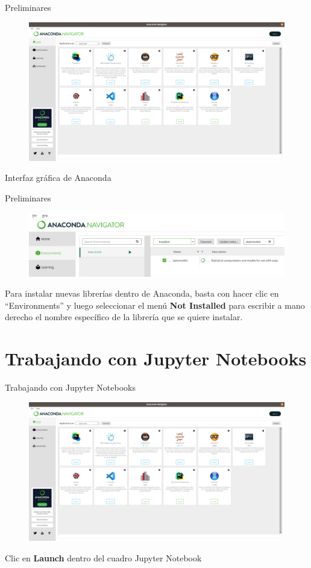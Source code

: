 \documentclass{beamer}
\begin{document}
\begin{frame}{Preliminares}
\begin{figure}
\includegraphics[width=.8\textwidth]{anaconda.png}
 \end{figure}
Interfaz gráfica de Anaconda
\end{frame}

\begin{frame}{Preliminares}
\begin{figure}
\includegraphics[width=.8\textwidth]{Install.png}
 \end{figure}
Para instalar nuevas librerías dentro de Anaconda, basta con hacer clic en ``Environments'' y luego seleccionar el menú \textbf{Not Installed} para escribir a mano derecho el nombre específico de la librería que se quiere instalar.
\end{frame}

\section{Trabajando con Jupyter Notebooks}
\begin{frame}{Trabajando con Jupyter Notebooks}
\begin{figure}
\includegraphics[width=.8\textwidth]{anaconda.png}
 \end{figure}
Clic en \textbf{Launch} dentro del cuadro Jupyter Notebook
\end{frame}
\end{document}
